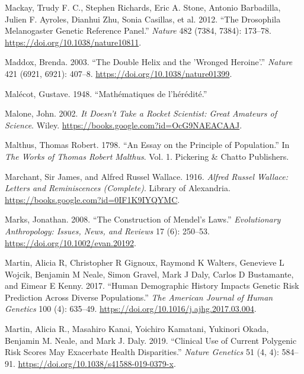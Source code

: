 \documentclass[
]{book}
\newlength{\cslhangindent}
\newlength{\cslentryspacingunit} %
\newenvironment{CSLReferences}[2] %
 {%
  \setlength{\parindent}{0pt}
  \ifodd #1
  \let\oldpar\par
  \def\par{\hangindent=\cslhangindent\oldpar}
  \fi
  \setlength{\parskip}{#2\cslentryspacingunit}
 }%
 {}
\begin{document}
\begin{CSLReferences}{1}{0}
\leavevmode{}%
Mackay, Trudy F. C., Stephen Richards, Eric A. Stone, Antonio Barbadilla, Julien F. Ayroles, Dianhui Zhu, Sonia Casillas, et al. 2012. {``The {Drosophila} Melanogaster {Genetic Reference Panel}.''} \emph{Nature} 482 (7384, 7384): 173--78. \url{https://doi.org/10.1038/nature10811}.

\leavevmode{}%
Maddox, Brenda. 2003. {``The Double Helix and the 'Wronged Heroine'.''} \emph{Nature} 421 (6921, 6921): 407--8. \url{https://doi.org/10.1038/nature01399}.

\leavevmode{}%
Malécot, Gustave. 1948. {``Mathématiques de l'hérédité.''}

\leavevmode{}%
Malone, John. 2002. \emph{It {Doesn}'t {Take} a {Rocket Scientist}: {Great Amateurs} of {Science}}. {Wiley}. \url{https://books.google.com?id=OcG9NAEACAAJ}.

\leavevmode{}%
Malthus, Thomas Robert. 1798. {``An Essay on the Principle of Population.''} In \emph{The Works of {Thomas Robert Malthus}}. Vol. 1. {Pickering \& Chatto Publishers}.

\leavevmode{}%
Marchant, Sir James, and Alfred Russel Wallace. 1916. \emph{Alfred {Russel Wallace}: {Letters} and {Reminiscences} ({Complete})}. {Library of Alexandria}. \url{https://books.google.com?id=0IF1K9IYQYMC}.

\leavevmode{}%
Marks, Jonathan. 2008. {``The Construction of {Mendel}'s Laws.''} \emph{Evolutionary Anthropology: Issues, News, and Reviews} 17 (6): 250--53. \url{https://doi.org/10.1002/evan.20192}.

\leavevmode{}%
Martin, Alicia R, Christopher R Gignoux, Raymond K Walters, Genevieve L Wojcik, Benjamin M Neale, Simon Gravel, Mark J Daly, Carlos D Bustamante, and Eimear E Kenny. 2017. {``Human Demographic History Impacts Genetic Risk Prediction Across Diverse Populations.''} \emph{The American Journal of Human Genetics} 100 (4): 635--49. \url{https://doi.org/10.1016/j.ajhg.2017.03.004}.

\leavevmode{}%
Martin, Alicia R., Masahiro Kanai, Yoichiro Kamatani, Yukinori Okada, Benjamin M. Neale, and Mark J. Daly. 2019. {``Clinical Use of Current Polygenic Risk Scores May Exacerbate Health Disparities.''} \emph{Nature Genetics} 51 (4, 4): 584--91. \url{https://doi.org/10.1038/s41588-019-0379-x}.


\end{CSLReferences}
\end{document}
